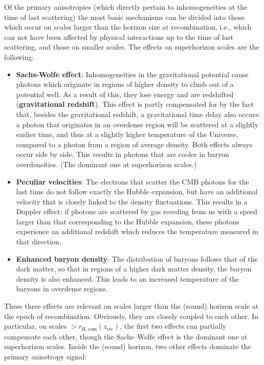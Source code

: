 \documentclass[a4paper,11pt]{article}
\begin{document}
{\noindent}Of the primary anisotropies (which directly pertain to inhomogeneities at the time of last scattering) the most basic mechanisms can be divided into those which occur on scales larger than the horizon size at recombination, i.e., which can not have been affected by physical interactions up to the time of last scattering, and those on smaller scales. The effects on superhorizon scales are the following:

\begin{itemize}
    \item \textbf{Sachs-Wolfe effect}: Inhomogeneities in the gravitational potential cause photons which originate in regions of higher density to climb out of a potential well. As a result of this, they lose energy and are redshifted (\textbf{gravitational redshift}). This effect is partly compensated for by the fact that, besides the gravitational redshift, a gravitational time delay also occurs: a photon that originates in an overdense region will be scattered at a slightly earlier time, and thus at a slightly higher temperature of the Universe, compared to a photon from a region of average density. Both effects always occur side by side. This results in photons that are cooler in baryon overdensities. (The dominant one at superhorizon scales.)
    \item \textbf{Peculiar velocities}: The electrons that scatter the CMB photons for the last time do not follow exactly the Hubble expansion, but have an additional velocity that is closely linked to the density fluctuations. This results in a Doppler effect: if photons are scattered by gas receding from us with a speed larger than that corresponding to the Hubble expansion, these photons experience an additional redshift which reduces the temperature measured in that direction.
    \item \textbf{Enhanced baryon density}: The distribution of baryons follows that of the dark matter, so that in regions of a higher dark matter density, the baryon density is also enhanced. This leads to an increased temperature of the baryons in overdense regions.
\end{itemize}

{\noindent}These three effects are relevant on scales larger than the (sound) horizon scale at the epoch of recombination. Obviously, they are closely coupled to each other. In particular, on scales $>r_\mathrm{H,com}(z_\mathrm{rec})$, the first two effects can partially compensate each other, though the Sachs–Wolfe effect is the dominant one at superhorizon scales. Inside the (sound) horizon, two other effects dominate the primary anisotropy signal:
\end{document}
